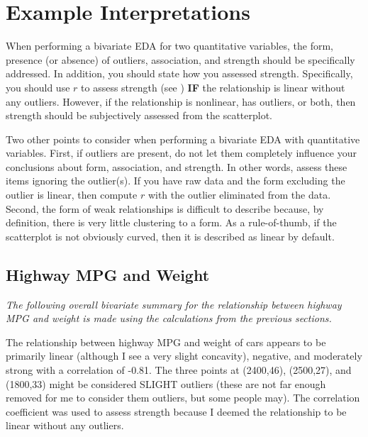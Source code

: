 \documentclass[10pt,openany]{book}\usepackage[]{graphicx}\usepackage[]{color}
\begin{document}
\newpage
\section{Example Interpretations}
When performing a bivariate EDA for two quantitative variables, the form, presence (or absence) of outliers, association, and strength should be specifically addressed. In addition, you should state how you assessed strength. Specifically, you should use $r$ to assess strength (see ) \textbf{IF} the relationship is linear without any outliers. However, if the relationship is nonlinear, has outliers, or both, then strength should be subjectively assessed from the scatterplot.

Two other points to consider when performing a bivariate EDA with quantitative variables. First, if outliers are present, do not let them completely influence your conclusions about form, association, and strength. In other words, assess these items ignoring the outlier(s). If you have raw data and the form excluding the outlier is linear, then compute $r$ with the outlier eliminated from the data. Second, the form of weak relationships is difficult to describe because, by definition, there is very little clustering to a form. As a rule-of-thumb, if the scatterplot is not obviously curved, then it is described as linear by default.


\vspace{-12pt}

\vspace{12pt}
\subsection*{Highway MPG and Weight}
\textit{The following overall bivariate summary for the relationship between highway MPG and weight is made using the calculations from the previous sections.}

The relationship between highway MPG and weight of cars  appears to be primarily linear (although I see a very slight concavity), negative, and moderately strong with a correlation of -0.81. The three points at (2400,46), (2500,27), and (1800,33) might be considered SLIGHT outliers (these are not far enough removed for me to consider them outliers, but some people may). The correlation coefficient was used to assess strength because I deemed the relationship to be linear without any outliers.
\end{document}
